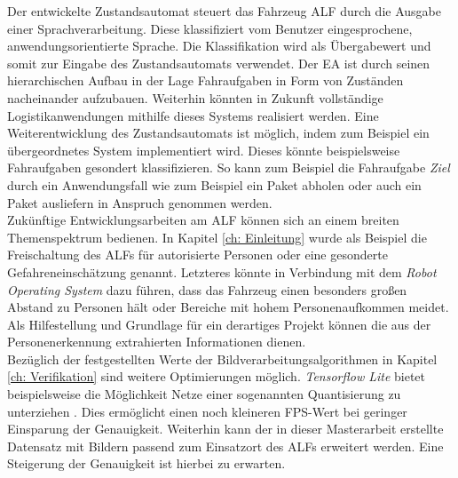 Der entwickelte Zustandsautomat steuert das Fahrzeug ALF durch die Ausgabe einer Sprachverarbeitung. Diese klassifiziert vom Benutzer eingesprochene, anwendungsorientierte Sprache. Die Klassifikation wird als Übergabewert und somit zur Eingabe des Zustandsautomats verwendet. Der EA ist durch seinen hierarchischen Aufbau in der Lage Fahraufgaben in Form von Zuständen nacheinander aufzubauen. Weiterhin könnten in Zukunft vollständige Logistikanwendungen mithilfe dieses Systems realisiert werden. Eine Weiterentwicklung des Zustandsautomats ist möglich, indem zum Beispiel ein übergeordnetes System implementiert wird. Dieses könnte beispielsweise Fahraufgaben gesondert klassifizieren. So kann zum Beispiel die Fahraufgabe \textit{Ziel} durch ein Anwendungsfall wie zum Beispiel ein Paket abholen oder auch ein Paket ausliefern in Anspruch genommen werden.\\


Zukünftige Entwicklungsarbeiten am ALF können sich an einem breiten Themenspektrum bedienen. In Kapitel \ref{ch: Einleitung} wurde als Beispiel die Freischaltung des ALFs für autorisierte Personen oder eine gesonderte Gefahreneinschätzung genannt. Letzteres könnte in Verbindung mit dem \textit{Robot Operating System} dazu führen, dass das Fahrzeug einen besonders großen Abstand zu Personen hält oder Bereiche mit hohem Personenaufkommen meidet. Als Hilfestellung und Grundlage für ein derartiges Projekt können die aus der Personenerkennung extrahierten Informationen dienen. \\

Bezüglich der festgestellten Werte der Bildverarbeitungsalgorithmen in Kapitel \ref{ch: Verifikation} sind weitere Optimierungen möglich. \textit{Tensorflow Lite} bietet beispielsweise die Möglichkeit Netze einer sogenannten Quantisierung zu unterziehen \cite{tflite}. Dies ermöglicht einen noch kleineren FPS-Wert bei geringer Einsparung der Genauigkeit. Weiterhin kann der in dieser Masterarbeit erstellte Datensatz mit Bildern passend zum Einsatzort des ALFs erweitert werden. Eine Steigerung der Genauigkeit ist hierbei zu erwarten.\\





